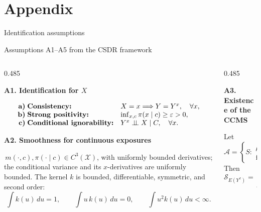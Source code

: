 \documentclass[
  ignorenonframetext,
  aspectratio=169,
  11pt]{beamer}
\makeatletter
\newif\ifcsdrappendix
\newcommand{\csdrrecordappendixboundary}{\beamer@appendixwrite}
\makeatother
\begin{document}
\section{Appendix}\label{appendix}

\begin{frame}{Identification assumptions}
\label{identification-assumptions}
\addtocounter{framenumber}{-1}
\csdrrecordappendixboundary
\addtocounter{framenumber}{1}
\global\csdrappendixtrue
\vspace{-0.40cm}
\begin{block}{Assumptions A1--A5 from the CSDR framework}
\begin{minipage}[t][4.15cm][t]{\linewidth}
\fontsize{6.6}{7.8}\selectfont
\setlength{\parskip}{0pt}
\setlength{\abovedisplayskip}{2.5pt}
\setlength{\belowdisplayskip}{2.5pt}
\setlength{\abovedisplayshortskip}{2pt}
\setlength{\belowdisplayshortskip}{2pt}

\begin{columns}[T,onlytextwidth]
\begin{column}{0.485\linewidth}
\raggedright
\textbf{\textcolor{emoryblue}{A1. Identification for \(X\)}}\par
\[
\begin{array}{@{}r@{\;}l@{\quad}l@{}}
\text{\bfseries a)} & \text{\bfseries Consistency:}
  & X=x\Longrightarrow Y=Y^x,\quad \forall x,\\
\text{\bfseries b)} & \text{\bfseries Strong positivity:}
  & \inf_{x,c}\pi(x\mid c)\ge\varepsilon>0,\\
\text{\bfseries c)} & \text{\bfseries Conditional ignorability:}
  & Y^x\perp\!\!\!\perp X\mid C,\quad \forall x .
\end{array}
\]

\vspace{0.10cm}
\textbf{\textcolor{emoryblue}{A2. Smoothness for continuous exposures}}\par
\(\,m(\cdot,c),\pi(\cdot\mid c)\in C^3(\mathcal X)\), with uniformly
bounded derivatives; the conditional variance and its \(x\)-derivatives are
uniformly bounded. The kernel \(k\) is bounded, differentiable, symmetric, and
second order:
\[
\int k(u)\,du=1,\qquad
\int u\,k(u)\,du=0,\qquad
\int u^2k(u)\,du<\infty .
\]
\end{column}

\begin{column}{0.485\linewidth}
\raggedright
\textbf{\textcolor{emoryblue}{A3. Existence of the CCMS}}\par
Let
\[
\mathcal A=
\left\{S:
\begin{array}{c}
\mu(x)=\mu(P_Sx)\\[-1pt]
\text{for all }x\in\mathcal X
\end{array}
\right\}.
\]
Then
\[
\mathcal S_{E(Y^x)}
=\bigcap_{S\in\mathcal A}S\in\mathcal A .
\]


\end{column}
\end{columns}
\end{minipage}
\end{block}
\end{frame}
\end{document}

